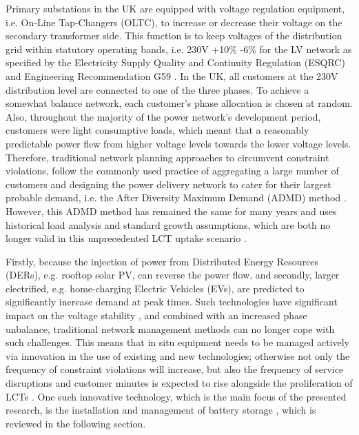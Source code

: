 Primary substations in the UK are equipped with voltage regulation equipment, i.e. On-Line Tap-Changers (OLTC), to increase or decrease their voltage on the secondary transformer side.
This function is to keep voltages of the distribution grid within statutory operating bands, i.e. 230V +10\% -6\% for the LV network as specified by the Electricity Supply Quality and Continuity Regulation (ESQRC) \cite{HealthandSafetyExecutive2002} and Engineering Recommendation G59 \cite{EnergyNetworksAssociation2013}.
In the UK, all customers at the 230V distribution level are connected to one of the three phases.
To achieve a somewhat balance network, each customer's phase allocation is chosen at random.
Also, throughout the majority of the power network's development period, customers were light consumptive loads, which meant that a reasonably predictable power flew from higher voltage levels towards the lower voltage levels.
Therefore, traditional network planning approaches to circumvent constraint violations, follow the commonly used practice of aggregating a large number of customers and designing the power delivery network to cater for their largest probable demand, i.e. the After Diversity Maximum Demand (ADMD) method \cite{Richardson2010a}.
However, this ADMD method has remained the same for many years and uses historical load analysis and standard growth assumptions, which are both no longer valid in this unprecedented LCT uptake scenario \cite{Yunusov2016}.

Firstly, because the injection of power from Distributed Energy Resources (DERs), e.g. rooftop solar PV, can reverse the power flow, and secondly, larger electrified, e.g. home-charging Electric Vehicles (EVs), are predicted to significantly increase demand at peak times.
Such technologies have significant impact on the voltage stability \cite{Petinrin2016}, and combined with an increased phase unbalance, traditional network management methods can no longer cope with such challenges.
This means that in situ equipment needs to be managed actively via innovation in the use of existing and new technologies; otherwise not only the frequency of constraint violations will increase, but also the frequency of service disruptions and customer minutes is expected to rise alongside the proliferation of LCTs \cite{Ault2008a}.
One such innovative technology, which is the main focus of the presented research, is the installation and management of battery storage \cite{Chen2009}, which is reviewed in the following section.















